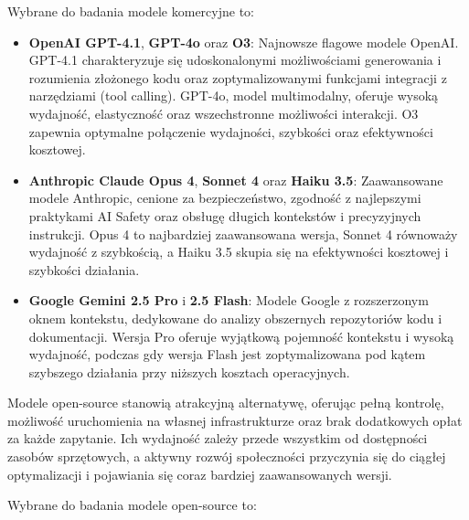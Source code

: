 Wybrane do badania modele komercyjne to:

\begin{itemize}
	\item \textbf{OpenAI GPT-4.1}, \textbf{GPT-4o} oraz \textbf{O3}: Najnowsze flagowe modele OpenAI. GPT-4.1 charakteryzuje się udoskonalonymi możliwościami generowania i rozumienia złożonego kodu oraz zoptymalizowanymi funkcjami integracji z narzędziami (tool calling). GPT-4o, model multimodalny, oferuje wysoką wydajność, elastyczność oraz wszechstronne możliwości interakcji. O3 zapewnia optymalne połączenie wydajności, szybkości oraz efektywności kosztowej.
	\item \textbf{Anthropic Claude Opus 4}, \textbf{Sonnet 4} oraz \textbf{Haiku 3.5}: Zaawansowane modele Anthropic, cenione za bezpieczeństwo, zgodność z najlepszymi praktykami AI Safety oraz obsługę długich kontekstów i precyzyjnych instrukcji. Opus 4 to najbardziej zaawansowana wersja, Sonnet 4 równoważy wydajność z szybkością, a Haiku 3.5 skupia się na efektywności kosztowej i szybkości działania.
	\item \textbf{Google Gemini 2.5 Pro} i \textbf{2.5 Flash}: Modele Google z rozszerzonym oknem kontekstu, dedykowane do analizy obszernych repozytoriów kodu i dokumentacji. Wersja Pro oferuje wyjątkową pojemność kontekstu i wysoką wydajność, podczas gdy wersja Flash jest zoptymalizowana pod kątem szybszego działania przy niższych kosztach operacyjnych.
\end{itemize}

Modele open-source stanowią atrakcyjną alternatywę, oferując pełną kontrolę, możliwość uruchomienia na własnej infrastrukturze oraz brak dodatkowych opłat za każde zapytanie. Ich wydajność zależy przede wszystkim od dostępności zasobów sprzętowych, a aktywny rozwój społeczności przyczynia się do ciągłej optymalizacji i pojawiania się coraz bardziej zaawansowanych wersji.

Wybrane do badania modele open-source to:

